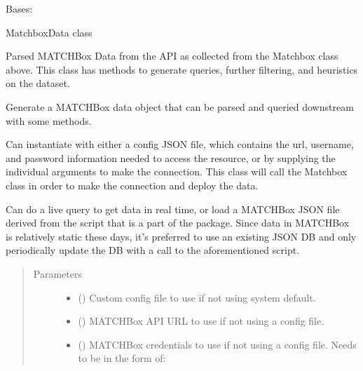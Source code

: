 \documentclass[letterpaper,10pt,english]{sphinxmanual}
\begin{document}
\begin{fulllineitems}
\label{\detokenize{matchbox_api_utils:matchbox_api_utils.match_data.MatchData}}
Bases: 

MatchboxData class

Parsed MATCHBox Data from the API as collected from the Matchbox class above.
This class has methods to generate queries, further filtering, and heuristics
on the dataset.

Generate a MATCHBox data object that can be parsed and queried downstream
with some methods.

Can instantiate with either a config JSON file, which contains the url,
username, and password information needed to access the resource, or by
supplying the individual arguments to make the connection.  This class will
call the Matchbox class in order to make the connection and deploy the data.

Can do a live query to get data in real time, or load a MATCHBox JSON file
derived from the  script that is a part of the
package.  Since data in MATCHBox is relatively static these days, it’s
preferred to use an existing JSON DB and only periodically update the DB with
a call to the aforementioned script.
\begin{quote}\begin{description}
\item[{Parameters}] \leavevmode\begin{itemize}
\item {} 
 () \textendash{} Custom config file to use if not using system
default.

\item {} 
 () \textendash{} MATCHBox API URL to use if not using a config file.

\item {} 
 () \textendash{} 
MATCHBox credentials to use if not using a config file.
Needs to be in the form of:
\begin{quote}


\end{quote}
\end{itemize}
\end{description}
\end{quote}
\end{fulllineitems}
\end{document}
